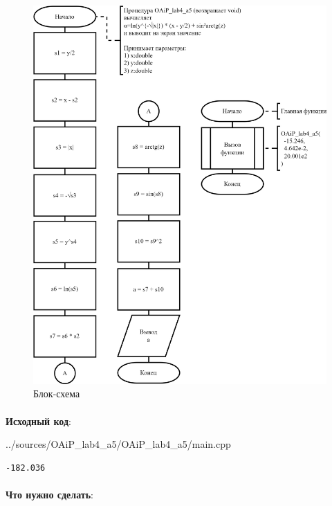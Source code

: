 \documentclass[12pt, a4paper, simple]{eskdtext}
\begin{document}
\begin{figure}[ph]
    \centering
    \includegraphics[]
    {../sources/flowcharts/OAiP_lab4_a5.png}
    \caption{Блок-схема}
    \label{fig:a5}
\end{figure}

\paragraph{} \textbf{Исходный код}: 


{../sources/OAiP_lab4_a5/OAiP_lab4_a5/main.cpp}

\begin{lstlisting}[name=Вывод в консоль]
-182.036
\end{lstlisting}

\paragraph{} \textbf{Что нужно сделать}:
\end{document}
